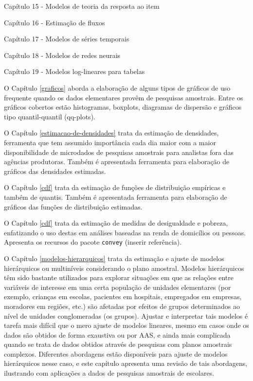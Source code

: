 \documentclass[
  12pt,
  brazilian,
]{book}
\theoremstyle{definition}
\theoremstyle{definition}
\theoremstyle{definition}
\theoremstyle{definition}
\theoremstyle{remark}
\begin{document}
Capítulo 15 - Modelos de teoria da resposta ao item

Capítulo 16 - Estimação de fluxos

Capítulo 17 - Modelos de séries temporais

Capítulo 18 - Modelos de redes neurais

Capítulo 19 - Modelos log-lineares para tabelas

O Capítulo \ref{graficos} aborda a elaboração de alguns tipos de gráficos de uso frequente quando os dados elementares provêm de pesquisas amostrais. Entre os gráficos cobertos estão histogramas, boxplots, diagramas de dispersão e gráficos tipo quantil-quantil (qq-plots).

O Capítulo \ref{estimacao-de-densidades} trata da estimação de densidades, ferramenta que tem assumido importância cada dia maior com a maior disponibilidade de microdados de pesquisas amostrais para analistas fora das agências produtoras. Também é apresentada ferramenta para elaboração de gráficos das densidades estimadas.

O Capítulo \ref{cdf} trata da estimação de funções de distribuição empíricas e também de quantis. Também é apresentada ferramenta para elaboração de gráficos das funções de distribuição estimadas.

O Capítulo \ref{cdf} trata da estimação de medidas de desigualdade e pobreza, enfatizando o uso destas em análises baseadas na renda de domicílios ou pessoas. Apresenta os recursos do pacote \texttt{convey} (inserir referência).

O Capítulo \ref{modelos-hierarquicos} trata da estimação e ajuste de modelos hierárquicos ou multiníveis considerando o plano amostral. Modelos hierárquicos têm sido bastante utilizados para explorar situações em que as relações entre variáveis de interesse em uma certa população de unidades elementares (por exemplo, crianças em escolas, pacientes em hospitais, empregados em empresas, moradores em regiões, etc.) são afetadas por efeitos de grupos determinados ao nível de unidades conglomeradas (os grupos). Ajustar e interpretar tais modelos é tarefa mais difícil que o mero ajuste de modelos lineares, mesmo em casos onde os dados são obtidos de forma exaustiva ou por AAS, e ainda mais complicada quando se trata de dados obtidos através de pesquisas com planos amostrais complexos. Diferentes abordagens estão disponíveis para ajuste de modelos hierárquicos nesse caso, e este capítulo apresenta uma revisão de tais abordagens, ilustrando com aplicações a dados de pesquisas amostrais de escolares.
\end{document}
